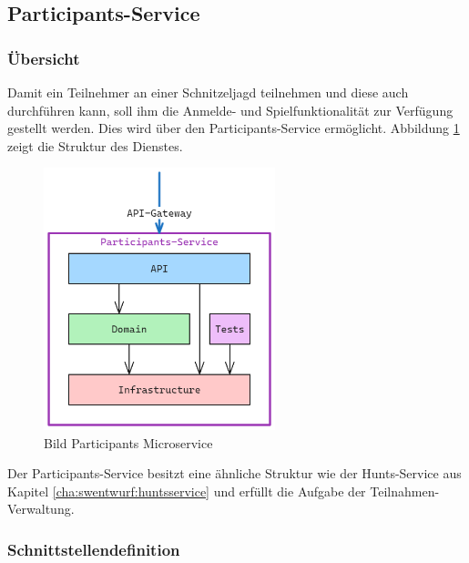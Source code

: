 \subsection{Participants-Service} \label{cha:swentwurf:participantsservice}

\subsubsection{Übersicht}

Damit ein Teilnehmer an einer Schnitzeljagd teilnehmen und diese auch durchführen kann, soll ihm die Anmelde- und Spielfunktionalität zur Verfügung gestellt werden. Dies wird über den Participants-Service ermöglicht. Abbildung \ref{fig:swentwurf:huntapi:participantservice} zeigt die Struktur des Dienstes.

\begin{figure}[H]
    \centering
    \includegraphics[width=0.6\textwidth]{images/PrAr-Software-Entwurf-Hunt-Api-Participant-Service.png}
    \caption{Bild Participants Microservice}
    \label{fig:swentwurf:huntapi:participantservice}
\end{figure}

Der Participants-Service besitzt eine ähnliche Struktur wie der Hunts-Service aus Kapitel \ref{cha:swentwurf:huntsservice} und erfüllt die Aufgabe der Teilnahmen-Verwaltung.

\subsubsection{Schnittstellendefinition}

